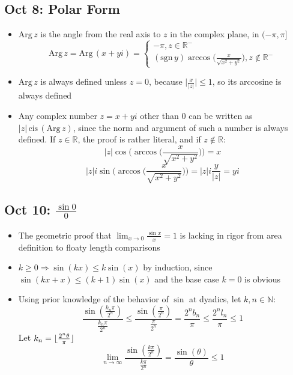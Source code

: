 \documentclass[10pt, oneside]{article}
\newcommand{\lti}[1]{\lim_{#1 \rightarrow \infty}}
\newcommand{\ltz}[1]{\lim_{#1 \rightarrow 0}}
\let\leq\leqslant
\let\geq\geqslant
\newcommand{\R}{\mathbb{R}}
\newcommand{\N}{\mathbb{N}}
\DeclarePairedDelimiter\floor{\lfloor}{\rfloor}
\newcommand{\cis}{\text{cis} \,}
\newcommand{\Arg}{\text{Arg} \,}
\newcommand{\sgn}{\text{sgn} \,}
\begin{document}
\subsection{Oct 8: Polar Form}
\begin{itemize}
    \item $\Arg z$ is the angle from the real axis to $z$ in the complex plane, in $(-\pi,\pi]$
        \[\Arg z = \Arg (x + yi) = \begin{cases}
            -\pi, z \in \R^-\\
            (\sgn y) \arccos \bigg( \displaystyle \frac{x}{\sqrt{x^2 + y^2}} \bigg), z \notin \R^-
        \end{cases}\]
    \item $\Arg z$ is always defined unless $z = 0$, because $\displaystyle \bigg| \frac{x}{|z|} \bigg| \leq 1$, so its arccosine is always defined
    \item Any complex number $z = x + yi$ other than $0$ can be written as $|z| \, \cis(\Arg z)$, since the norm and argument of such a number is always defined. If $z \in \R$, the proof is rather literal, and if $z \notin \R$:
        \[|z| \cos \bigg( \arccos \bigg( \frac{x}{\sqrt{x^2 + y^2}} \bigg) \bigg) = x\]
        \[|z| i \sin \bigg( \arccos \bigg( \frac{x}{\sqrt{x^2 + y^2}} \bigg) \bigg) = |z| i \frac{y}{|z|} = yi\]
\end{itemize}

\subsection{Oct 10: $\frac{\sin 0}{0}$}
\begin{itemize}
    \item The geometric proof that $\displaystyle \ltz{x} \frac{\sin x}{x} = 1$ is lacking in rigor from area definition to floaty length comparisons
    \item $k \geq 0 \Rightarrow \sin(kx) \leq k\sin(x)$ by induction, since $\sin(kx + x) \leq (k + 1)\sin(x)$ and the base case $k = 0$ is obvious
    \item Using prior knowledge of the behavior of $\sin$ at dyadics, let $k,n \in \N$:
        \[\frac{\sin(\frac{k_n \pi}{2^n})}{\frac{k_n \pi}{2^n}} \leq \frac{\sin(\frac{\pi}{2^n})}{\frac{\pi}{2^n}} = \frac{2^n b_n}{\pi} \leq \frac{2^n l_n}{\pi} \leq 1\]
        Let $k_n = \floor{\frac{2^n \theta}{\pi}}$
        \[\lti{n} \frac{\sin(\frac{k \pi}{2^n})}{\frac{k \pi}{2^n}} = \frac{\sin(\theta)}{\theta} \leq 1\]
    \end{itemize}
\end{document}
